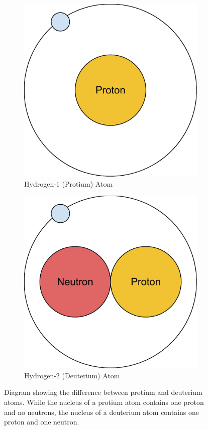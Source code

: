 \documentclass{l4proj}
\begin{document}
\begin{figure}[htb]
\centering
\begin{subfigure}{0.3\linewidth}
        \includegraphics[width=\linewidth]{dissertation/images/Hydrogen-1.pdf}
        \caption{Hydrogen-1 (Protium) Atom}
    \end{subfigure}
    \begin{subfigure}{0.3\linewidth}
        \includegraphics[width=\linewidth]{dissertation/images/Deutereum.pdf}
    \caption{Hydrogen-2 (Deuterium) Atom}
    \end{subfigure}
    \caption{Diagram showing the difference between protium and deuterium atoms. While the nucleus of a protium atom contains one proton and no neutrons, the nucleus of a deuterium atom contains one proton and one neutron.}
    \label{fig:h1-vs-h2}
\end{figure}
\end{document}
